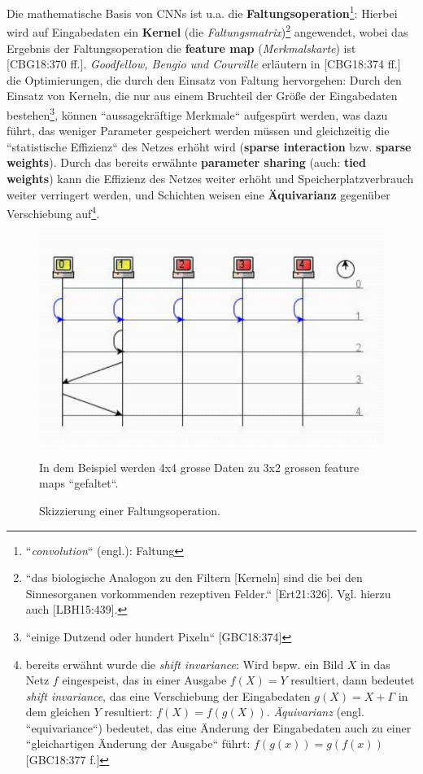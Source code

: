 Die mathematische Basis von CNNs ist u.a. die \textbf{Faltungsoperation}\footnote{
    ``\textit{convolution}`` (engl.): Faltung
}: Hierbei wird auf Eingabedaten ein \textbf{Kernel} (die \textit{Faltungsmatrix})\footnote{
    ``das biologische Analogon zu den Filtern [Kerneln] sind die bei den Sinnesorganen vorkommenden rezeptiven Felder.`` [Ert21:326]. Vgl. hierzu auch [LBH15:439].
} angewendet, wobei das Ergebnis der Faltungsoperation die \textbf{feature map} (\textit{Merkmalskarte}) ist [CBG18:370 ff.]. \textit{Goodfellow, Bengio und Courville} erläutern in [CBG18:374 ff.] die Optimierungen, die durch den Einsatz von Faltung hervorgehen: Durch den Einsatz von Kerneln, die nur aus einem Bruchteil der Größe der Eingabedaten bestehen\footnote{ ``einige Dutzend oder hundert Pixeln`` [GBC18:374]
}, können ``aussagekräftige Merkmale`` aufgespürt werden, was dazu führt, das weniger Parameter gespeichert werden müssen und gleichzeitig die ``statistische Effizienz`` des Netzes erhöht wird (\textbf{sparse interaction} bzw. \textbf{sparse weights}). Durch das bereits erwähnte \textbf{parameter sharing} (auch: \textbf{tied weights}) kann die Effizienz des Netzes weiter erhöht und Speicherplatzverbrauch weiter verringert werden, und Schichten weisen eine \textbf{Äquivarianz} gegenüber Verschiebung auf\footnote{ bereits erwähnt wurde die \textit{shift invariance}: Wird bspw. ein Bild $X$ in das Netz $f$ eingespeist, das in einer Ausgabe $f(X) = Y$ resultiert, dann bedeutet \textit{shift invariance}, das eine Verschiebung der Eingabedaten $g(X) = X+\Gamma$ in dem gleichen $Y$ resultiert: $f(X) = f(g(X))$.  \textit{Äquivarianz} (engl. ``equivariance``) bedeutet, das eine Änderung der Eingabedaten auch zu einer ``gleichartigen Änderung der Ausgabe`` führt: $f(g(x)) = g(f(x))$ [GBC18:377 f.]
}.

\begin{figure}[h]
    \centering
    \includegraphics{images/p1ReadSeq.pdf}
    \caption{Skizzierung einer Faltungsoperation.}
    \label{fig-faltung}
    \small
    In dem Beispiel werden 4x4 grosse Daten zu 3x2 grossen feature maps ``gefaltet``.
\end{figure}



